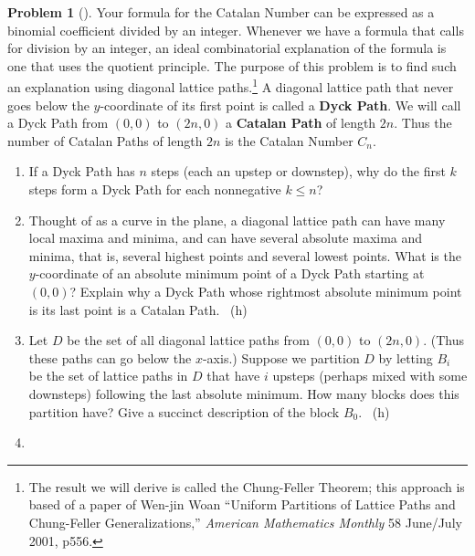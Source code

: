 \documentclass[10pt,]{book}
\newcommand{\terminology}[1]{\textbf{#1}}
\theoremstyle{plain}
\theoremstyle{definition}
\newtheorem{activity}[project]{Problem}
\theoremstyle{definition}
\numberwithin{equation}{chapter}
\newcommand{\importantarrow}{\Rightarrow}
\begin{document}
\begin{activity}[]\marginsymbol[-1em]{\pdftooltip{$\importantarrow$}{especially interesting}} \label{activity-52}
\hypertarget{p-307}{}%
Your formula for the Catalan Number can be expressed as a binomial coefficient divided by an integer. Whenever we have a formula that calls for division by an integer, an ideal combinatorial explanation of the formula is one that uses the quotient principle. The purpose of this problem is to find such an explanation using diagonal lattice paths.\footnote{The result we will derive is called the Chung-Feller Theorem; this approach is based of a paper of Wen-jin Woan ``Uniform Partitions of Lattice Paths and Chung-Feller Generalizations,'' \textsl{American Mathematics Monthly} 58 June/July 2001, p556.\label{fn-3}} A diagonal lattice path that never goes below the \(y\)-coordinate of its first point is called a \terminology{Dyck Path}. We will call a Dyck Path from \((0,0)\) to \((2n,0)\) a \terminology{Catalan Path} of length \(2n\). Thus the number of Catalan Paths of length \(2n\) is the Catalan Number \(C_n\).%
\begin{enumerate}[font=\bfseries,label=(\alph*),ref=\alph*]
\item\label{task-59} \marginsymbol[-2.5em]{} \hypertarget{p-308}{}%
If a Dyck Path has \(n\) steps (each an upstep or downstep), why do the first \(k\) steps form a Dyck Path for each nonnegative \(k\le n\)?%
\item\label{task-60} \marginsymbol[-2.5em]{} \hypertarget{p-310}{}%
Thought of as a curve in the plane, a diagonal lattice path can have many local maxima and minima, and can have several absolute maxima and minima, that is, several highest points and several lowest points. What is the \(y\)-coordinate of an absolute minimum point of a Dyck Path starting at \((0,0)\)?  Explain why a Dyck Path whose rightmost absolute minimum point is its last point is a Catalan Path.%
~{\tiny (h)}\item\label{task-61} \marginsymbol[-2.5em]{} \hypertarget{p-313}{}%
Let \(D\) be the set of all diagonal lattice paths from \((0,0)\) to \((2n,0)\).  (Thus these paths can go below the \(x\)-axis.) Suppose we partition \(D\) by letting \(B_i\) be the set of lattice paths in \(D\) that have \(i\) upsteps (perhaps mixed with some downsteps) following the last absolute minimum.  How many blocks does this partition have?  Give a succinct description of the block \(B_0\).%
~{\tiny (h)}\item\label{task-62} \marginsymbol[-2.5em]{} \hypertarget{p-316}{}%

\end{enumerate}
\end{activity}
\end{document}
